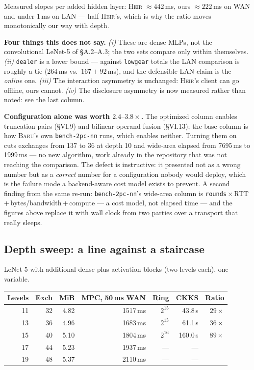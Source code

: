 \documentclass[10pt]{article}
\newcommand{\baru}{\textsc{Baru}}
\newcommand{\heir}{\textsc{Heir}}
\begin{document}
\noindent Measured slopes per added hidden layer: \heir{}
${\approx}442$\,ms, ours ${\approx}222$\,ms on WAN and under 1\,ms on LAN ---
half \heir{}'s, which is why the ratio moves monotonically our way with depth.

\medskip
\noindent\textbf{Four things this does not say.} \emph{(i)} These are dense
MLPs, not the convolutional LeNet-5 of §A.2--A.3; the two sets compare only
within themselves. \emph{(ii)} \texttt{dealer} is a lower bound --- against
\texttt{lowgear} totals the LAN comparison is roughly a tie
(264\,ms vs.\ $167+92$\,ms), and the defensible LAN claim is the \emph{online}
one. \emph{(iii)} The interaction asymmetry is unchanged: \heir{}'s client can
go offline, ours cannot. \emph{(iv)} The disclosure asymmetry is now
measured rather than noted: see the last column.

\medskip
\noindent\textbf{Configuration alone was worth $2.4\text{--}3.8\times$.} The
optimized column enables truncation pairs (§VI.9) and bilinear operand fusion
(§VI.13); the base column is how \baru{}'s own \texttt{bench-2pc-nn} runs, which
enables neither. Turning them on cuts exchanges from 137 to 36 at depth 10 and
wide-area elapsed from 7695\,ms to 1999\,ms --- no new algorithm, work already
in the repository that was not reaching the comparison. The defect is
instructive: it presented not as a wrong number but as a \emph{correct} number
for a configuration nobody would deploy, which is the failure mode a
backend-aware cost model exists to prevent. A second finding from the same
re-run: \texttt{bench-2pc-nn}'s wide-area column is
\texttt{rounds}\,$\times$\,RTT\,$+$\,bytes/bandwidth\,$+$\,compute --- a cost
model, not elapsed time --- and the figures above replace it with wall clock
from two parties over a transport that really sleeps.

\subsection{Depth sweep: a line against a staircase}

LeNet-5 with additional dense-plus-activation blocks (two levels each), one
variable.

\begin{center}\small
\begin{tabular}{@{}rrrrrrr@{}}
\toprule
\textbf{Levels} & \textbf{Exch} & \textbf{MiB} & \textbf{MPC, 50\,ms WAN} & \textbf{Ring} & \textbf{CKKS} & \textbf{Ratio} \\
\midrule
11 & 32 & 4.82 & 1517\,ms & $2^{15}$ & 43.8\,s & $29\times$ \\
13 & 36 & 4.96 & 1683\,ms & $2^{15}$ & 61.1\,s & $36\times$ \\
15 & 40 & 5.10 & 1804\,ms & $2^{16}$ & 160.0\,s & $89\times$ \\
17 & 44 & 5.23 & 1937\,ms & --- & --- & \\
19 & 48 & 5.37 & 2110\,ms & --- & --- & \\
\bottomrule
\end{tabular}
\end{center}
\end{document}
